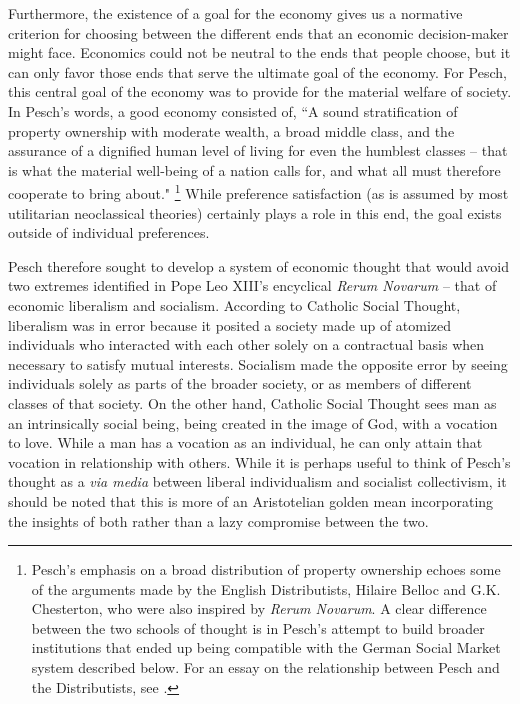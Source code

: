 \documentclass{article}
\begin{document}
Furthermore, the existence of a goal for the economy gives us a normative criterion for choosing between the different ends that an economic decision-maker might face.  Economics could not be neutral to the ends that people choose, but it can only favor those ends that serve the ultimate goal of the economy.  For Pesch, this central goal of the economy was to provide for the material welfare of society.  \citep{mulcahy1949}  In Pesch’s words, a good economy consisted of, ``A sound stratification of property ownership with moderate wealth, a broad middle class, and the assurance of a dignified human level of living for even the humblest classes – that is what the material well-being of a nation calls for, and what all must therefore cooperate to bring about." \citep[p. 180]{pesch1998}\footnote{Pesch's emphasis on a broad distribution of property ownership echoes some of the arguments made by the English Distributists, Hilaire Belloc and G.K. Chesterton, who were also inspired by \emph{Rerum Novarum}.  A clear difference between the two schools of thought is in Pesch's attempt to build broader institutions that ended up being compatible with the German Social Market system described below.  For an essay on the relationship between Pesch and the Distributists, see \citet{storck2008}.}  While preference satisfaction (as is assumed by most utilitarian neoclassical theories) certainly plays a role in this end, the goal exists outside of individual preferences.\medskip

Pesch therefore sought to develop a system of economic thought that would avoid two extremes identified in Pope Leo XIII’s encyclical \emph{Rerum Novarum} – that of economic liberalism and socialism.  According to Catholic Social Thought, liberalism was in error because it posited a society made up of atomized individuals who interacted with each other solely on a contractual basis when necessary to satisfy mutual interests.  Socialism made the opposite error by seeing individuals solely as parts of the broader society, or as members of different classes of that society. \citep{schuyler1953}  On the other hand, Catholic Social Thought sees man as an intrinsically social being, being created in the image of God, with a vocation to love. \citep[no. 34]{pcjp2004}  While a man has a vocation as an individual, he can only attain that vocation in relationship with others.  While it is perhaps useful to think of Pesch’s thought as a \emph{via media} between liberal individualism and socialist collectivism, it should be noted that this is more of an Aristotelian golden mean incorporating the insights of both rather than a lazy compromise between the two. \citep{koslowski2000}\medskip
\end{document}
